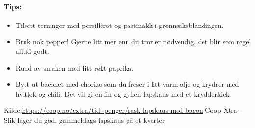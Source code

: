 \paragraph{Tips:}
\begin{itemize}[noitemsep]
	\item Tilsett terninger med persillerot og pastinakk i grønnsaksblandingen.
	\item Bruk nok pepper! Gjerne litt mer enn du tror er nødvendig, det blir som regel alltid godt.
	\item Rund av smaken med litt røkt paprika.
	\item   Bytt ut baconet med chorizo som du freser i litt varm olje og krydrer med hvitløk og chili. Det vil gi en fin og gyllen lapskaus med et krydderkick.
\end{itemize}

Kilde:\url{https://coop.no/extra/tid--penger/rask-lapskaus-med-bacon} Coop Xtra -- Slik lager du god, gammeldags lapskaus på et kvarter
